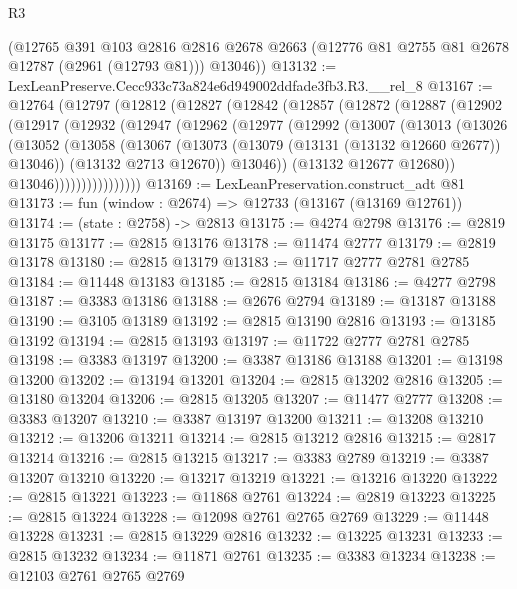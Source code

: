 \begin{lexlean}{R3}
\begin{coremodule}
      (@12765
        @391
        @103
        @2816
        @2816
        @2678
        @2663
        (@12776 @81 @2755 @81 @2678 @12787 (@2961 (@12793 @81)))
        @13046))
@13132 := LexLeanPreserve.Cecc933c73a824e6d949002ddfade3fb3.R3.__rel_8
@13167 := @12764
    (@12797
      (@12812
        (@12827
          (@12842
            (@12857
              (@12872
                (@12887
                  (@12902
                    (@12917
                      (@12932
                        (@12947
                          (@12962
                            (@12977
                              (@12992
                                (@13007
                                  (@13013
                                    (@13026
                                      (@13052
                                        (@13058
                                          (@13067
                                            (@13073 (@13079 (@13131 (@13132 @12660 @2677)) @13046))
                                            (@13132 @2713 @12670))
                                          @13046))
                                      (@13132 @12677 @12680))
                                    @13046))))))))))))))))
@13169 := LexLeanPreservation.construct_adt @81
@13173 := fun (window : @2674) => @12733 (@13167 (@13169 @12761))
@13174 := (state : @2758) -> @2813
@13175 := @4274 @2798
@13176 := @2819 @13175
@13177 := @2815 @13176
@13178 := @11474 @2777
@13179 := @2819 @13178
@13180 := @2815 @13179
@13183 := @11717 @2777 @2781 @2785
@13184 := @11448 @13183
@13185 := @2815 @13184
@13186 := @4277 @2798
@13187 := @3383 @13186
@13188 := @2676 @2794
@13189 := @13187 @13188
@13190 := @3105 @13189
@13192 := @2815 @13190 @2816
@13193 := @13185 @13192
@13194 := @2815 @13193
@13197 := @11722 @2777 @2781 @2785
@13198 := @3383 @13197
@13200 := @3387 @13186 @13188
@13201 := @13198 @13200
@13202 := @13194 @13201
@13204 := @2815 @13202 @2816
@13205 := @13180 @13204
@13206 := @2815 @13205
@13207 := @11477 @2777
@13208 := @3383 @13207
@13210 := @3387 @13197 @13200
@13211 := @13208 @13210
@13212 := @13206 @13211
@13214 := @2815 @13212 @2816
@13215 := @2817 @13214
@13216 := @2815 @13215
@13217 := @3383 @2789
@13219 := @3387 @13207 @13210
@13220 := @13217 @13219
@13221 := @13216 @13220
@13222 := @2815 @13221
@13223 := @11868 @2761
@13224 := @2819 @13223
@13225 := @2815 @13224
@13228 := @12098 @2761 @2765 @2769
@13229 := @11448 @13228
@13231 := @2815 @13229 @2816
@13232 := @13225 @13231
@13233 := @2815 @13232
@13234 := @11871 @2761
@13235 := @3383 @13234
@13238 := @12103 @2761 @2765 @2769

\end{coremodule}
\end{lexlean}
